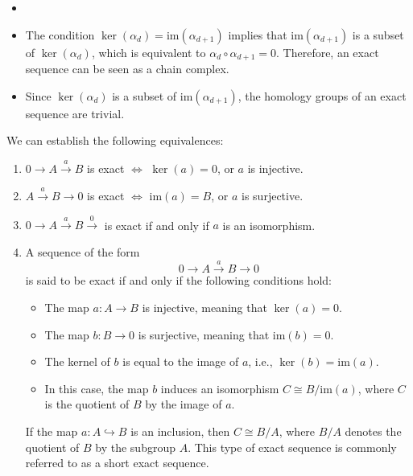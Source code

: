 \begin{remark}
\begin{itemize}
\item[]

\item The condition \( \ker(\alpha_{d}) = \mathrm{im}(\alpha_{d+1}) \) implies that \( \mathrm{im}(\alpha_{d+1}) \) is a subset of \( \ker(\alpha_{d}) \), which is equivalent to \( \alpha_{d} \circ \alpha_{d+1} = 0 \). Therefore, an exact sequence can be seen as a chain complex.

\item Since \( \ker(\alpha_{d}) \) is a subset of \( \mathrm{im}(\alpha_{d+1}) \), the homology groups of an exact sequence are trivial.
\end{itemize}
\end{remark}

\begin{proposition}{\cite[\S 1.3.1]{Weibel1994}}
	We can establish the following equivalences:
	\begin{enumerate}
		\item $0 \xrightarrow{}A \xrightarrow{a}B$ is exact $\Longleftrightarrow$ $\ker
			(a) = 0$, or $a$ is injective.

		\item $A \xrightarrow{a}B \rightarrow 0$ is exact $\Longleftrightarrow$ $\mathrm{im}
			(a) = B$, or $a$ is surjective.

		\item $0 \xrightarrow{}A \xrightarrow{a}B \xrightarrow 0$ is exact if and only
			if $a$ is an isomorphism.

		\item A sequence of the form
			\begin{equation}
				0 \xrightarrow{}A \xrightarrow{a}B \xrightarrow{}0
			\end{equation}
			is said to be exact if and only if the following conditions hold:
			\begin{itemize}
				\item The map $a: A \rightarrow B$ is injective, meaning that
					$\ker(a) = 0$.

				\item The map $b: B \rightarrow 0$ is surjective, meaning that
					$\mathrm{im}(b) = 0$.

				\item The kernel of $b$ is equal to the image of $a$, i.e.,
					$\ker(b) = \mathrm{im}(a)$.

				\item In this case, the map $b$ induces an isomorphism
					$C \cong B/\mathrm{im}(a)$, where $C$ is the quotient of $B$ by the image
					of $a$.
			\end{itemize}
			If the map $a: A \hookrightarrow B$ is an inclusion, then $C \cong B/A$,
			where $B/A$ denotes the quotient of $B$ by the subgroup $A$. This type of exact
			sequence is commonly referred to as a short exact sequence.
	\end{enumerate}
\end{proposition}

